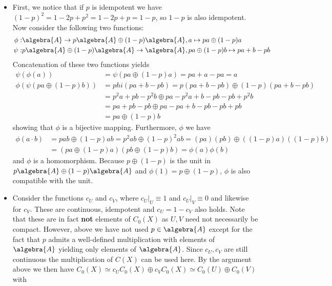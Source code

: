 \documentclass[a4paper]{article}
\begin{document}
\makeexheadereng

\setcounter{subsection}{4}
\subsection{}

\begin{itemize}
    \item First, we notice that if $p$ is idempotent we have $(1-p)^2 = 1 - 2p + p^2 = 1 - 2p + p = 1-p$, so $1-p$ is also idempotent. Now consider the following two functions:
    \begin{align*}
        \phi: &\algebra{A} \to p \algebra{A} \oplus (1-p) \algebra{A}, a \mapsto pa \oplus (1-p)a\\
        \psi: &p \algebra{A} \oplus (1-p) \algebra{A} \to \algebra{A}, pa \oplus (1-p)b \mapsto pa + b - pb
    \end{align*}
    Concatenation of these two functions yields
    \begin{align*}
        \psi(\phi(a)) &= \psi(pa \oplus (1-p)a) = pa + a - pa = a\\
        \phi(\psi(pa \oplus (1-p)b)) &= phi(pa + b - pb) = p (pa + b - pb) \oplus (1-p)(pa + b - pb)\\
        &= p^2 a + pb - p^2b \oplus pa - p^2a + b - pb - pb + p^2 b\\
        &= p a + pb - pb \oplus pa - pa + b - pb - pb + pb\\
        &= pa \oplus (1-p) b
    \end{align*}
    showing that $\phi$ is a bijective mapping. Furthermore, $\phi$ we have
    \begin{align*}
        \phi(a \cdot b) &= p a b \oplus (1-p) ab = p^2 ab \oplus (1-p)^2 ab = (pa)(pb) \oplus ((1-p)a)((1-p)b)\\
        &= (pa \oplus (1-p)a) (pb \oplus (1-p)b) = \phi(a) \phi(b)
    \end{align*}
    and $\phi$ is a homomorphism. Because $p \oplus (1-p)$ is the unit in $p \algebra{A} \oplus (1-p) \algebra{A}$ and $\phi(1) = p \oplus (1-p)$, $\phi$ is also compatible with the unit.
    \item Consider the functions $c_U$ and $c_V$, where $c_U|_U \equiv 1$ and $c_U|_V \equiv 0$ and likewise for $c_V$. These are continuous, idempotent and $c_U = 1 - c_V$ also holds. Note that these are in fact \textbf{not} elements of $C_0(X)$ as $U,V$ need not necessarily be compact. However, above we have not used $p \in \algebra{A}$ except for the fact that $p$ admits a well-defined multiplication with elements of $\algebra{A}$ yielding only elements of $\algebra{A}$. Since $c_U,c_V$ are still continuous the multiplication of $C(X)$ can be used here. By the argument above we then have $C_0(X) \simeq c_U C_0(X) \oplus c_V C_0(X) \simeq C_0(U) \oplus C_0(V)$ with 

\end{itemize}
\end{document}
